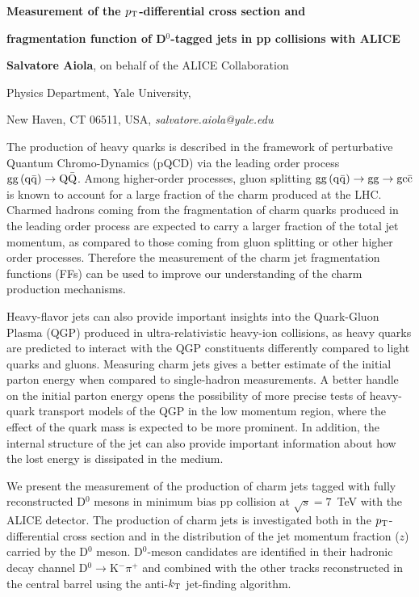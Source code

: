 \documentclass[12pt]{article}
\begin{document}
\centerline{\bf 
Measurement of the $p_{\rm T}$-differential cross section and
}

\centerline{\bf 
fragmentation function of D$^0$-tagged jets in pp collisions with ALICE
}

\vspace{12pt}

\centerline{ {\bf Salvatore Aiola}, on behalf of the ALICE Collaboration }

\vspace{12pt}

\centerline{Physics Department, Yale University,
}\centerline{New Haven, CT 06511, USA, {\it salvatore.aiola@yale.edu}}

\vspace{12pt}


\vspace{12pt} \vspace{12pt}

The production of heavy quarks is described in the framework of perturbative Quantum Chromo-Dynamics (pQCD) via the leading order process ${\rm gg\, (q\bar{q})} \rightarrow {\rm Q\bar{Q}}$.
Among higher-order processes, gluon splitting ${\rm gg\, (q\bar{q})} \rightarrow {\rm gg} \rightarrow \rm gc\bar{c}$
is known to account for a large fraction of the charm produced at the LHC.
Charmed hadrons coming from the fragmentation of charm quarks
produced in the leading order process
are expected to carry a larger fraction of the total jet momentum,
as compared to those coming from gluon splitting or other higher order processes. 
Therefore the measurement of the charm jet fragmentation functions (FFs) 
can be used to improve our understanding of the charm production mechanisms.

Heavy-flavor jets can also provide important insights into the Quark-Gluon Plasma (QGP)
produced in ultra-relativistic heavy-ion collisions, as heavy quarks are predicted
to interact with the QGP constituents differently compared to light quarks and gluons. 
Measuring charm jets gives a better estimate of the initial parton energy
when compared to single-hadron measurements.
A better handle on the initial parton energy opens the possibility of more precise tests of 
heavy-quark transport models of the QGP in the low momentum region,
where the effect of the quark mass is expected to be more prominent.
In addition, the internal structure of the jet can also provide important information
about how the lost energy is dissipated in the medium.

We present the measurement of the production of charm jets tagged with fully reconstructed D$^0$ mesons in minimum bias pp collision at $\sqrt{s} = 7$~TeV with the ALICE detector. 
The production of charm jets is investigated both in the $p_{\rm T}$-differential cross section and in the distribution of the jet momentum fraction ($z$) carried by the D$^0$ meson.
D$^0$-meson candidates are identified in their hadronic decay channel D$^0\rightarrow$K$^{-}\pi^{+}$ and combined with the other tracks reconstructed in the central barrel using the anti-$k_{\rm T}$ jet-finding algorithm.
\end{document}
